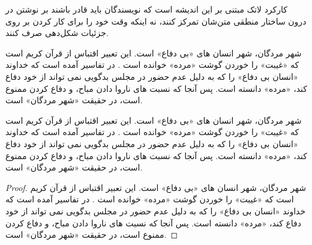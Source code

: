 کارکرد لاتک مبتنی بر این اندیشه است که نویسندگان باید قادر باشند بر نوشتن در درون ساختار منطقی متن‌شان تمرکز کنند، نه اینکه وقت خود را برای کار کردن بر روی جزئیات شکل‌دهی صرف کنند. 

\begin{nttheorem}
شهر مردگان، شهر انسان های «بی دفاع» است. این تعبیر اقتباس از قرآن کریم است که «غیبت» را خوردن گوشت «مرده» خوانده است . در تفاسیر آمده است که خداوند «انسان بی دفاع» را که به دلیل عدم حضور در مجلس بدگویی نمی تواند از خود دفاع کند، «مرده» دانسته است. پس آنجا که نسبت های ناروا دادن مباح، و دفاع کردن ممنوع است، در حقیقت «شهر مردگان» است.
\end{nttheorem}
\begin{nttheorem}
شهر مردگان، شهر انسان های «بی دفاع» است. این تعبیر اقتباس از قرآن کریم است که «غیبت» را خوردن گوشت «مرده» خوانده است . در تفاسیر آمده است که خداوند «انسان بی دفاع» را که به دلیل عدم حضور در مجلس بدگویی نمی تواند از خود دفاع کند، «مرده» دانسته است. پس آنجا که نسبت های ناروا دادن مباح، و دفاع کردن ممنوع است، در حقیقت «شهر مردگان» است.
\end{nttheorem}
\begin{proof}
شهر مردگان، شهر انسان های «بی دفاع» است. این تعبیر اقتباس از قرآن کریم است که «غیبت» را خوردن گوشت «مرده» خوانده است . در تفاسیر آمده است که خداوند «انسان بی دفاع» را که به دلیل عدم حضور در مجلس بدگویی نمی تواند از خود دفاع کند، «مرده» دانسته است. پس آنجا که نسبت های ناروا دادن مباح، و دفاع کردن ممنوع است، در حقیقت «شهر مردگان» است.
\end{proof}

